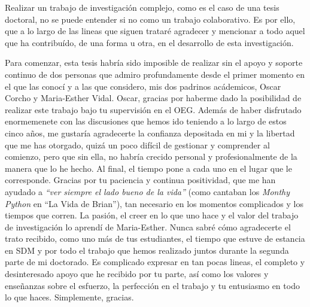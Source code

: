 
\begin{acknowledgementslong} 

Realizar un trabajo de investigación complejo, como es el caso de una tesis doctoral, no se puede entender si no como un trabajo colaborativo. Es por ello, que a lo largo de las lineas que siguen trataré agradecer y mencionar a todo aquel que ha contribuído, de una forma u otra, en el desarrollo de esta investigación.

Para comenzar, esta tesis habría sido imposible de realizar sin el apoyo y soporte continuo de dos personas que admiro profundamente desde el primer momento en el que las conocí y a las que considero, mis dos padrinos acádemicos, Oscar Corcho y Maria-Esther Vidal. Oscar, gracias por haberme dado la posibilidad de realizar este trabajo bajo tu supervisión en el OEG. Además de haber disfrutado enormemenete con las discusiones que hemos ido teniendo a lo largo de estos cinco años, me gustaría agradecerte la confianza depositada en mi y la libertad que me has otorgado, quizá un poco difícil de gestionar y comprender al comienzo, pero que sin ella, no habría crecido personal y profesionalmente de la manera que lo he hecho. Al final, el tiempo pone a cada uno en el lugar que le corresponde. Gracias por tu paciencia y continua positividad, que me han ayudado a \textit{``ver siempre el lado bueno de la vida''} (como cantaban los \textit{Monthy Python} en ``La Vida de Brian''), tan necesario en los momentos complicados y los tiempos que corren. La pasión, el creer en lo que uno hace y el valor del trabajo de investigación lo aprendí de Maria-Esther. Nunca sabré cómo agradecerte el trato recibido, como uno más de tus estudiantes, el tiempo que estuve de estancia en SDM y por todo el trabajo que hemos realizado juntos durante la segunda parte de mi doctorado. Es complicado expresar en tan pocas lineas, el completo y desinteresado apoyo que he recibido por tu parte, así como los valores y enseñanzas sobre el esfuerzo, la perfección en el trabajo y tu entusiasmo en todo lo que haces. Simplemente, gracias. 


\end{acknowledgementslong}
